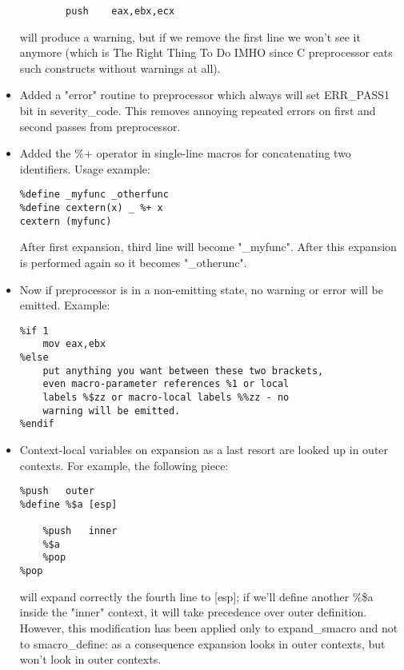 \begin{itemize}
{\begin{lstlisting}
        push    eax,ebx,ecx
\end{lstlisting}
        will produce a warning, but if we remove the first line we won't see it
        anymore (which is The Right Thing To Do \texttrademark IMHO since C
        preprocessor eats such constructs without warnings at all).}
    \item{Added a "error" routine to preprocessor which always will set ERR\_PASS1
        bit in severity\_code. This removes annoying repeated errors on first
        and second passes from preprocessor.}
    \item{Added the \%+ operator in single-line macros for concatenating two
        identifiers. Usage example:
\begin{lstlisting}
%define _myfunc _otherfunc
%define cextern(x) _ %+ x
cextern (myfunc)
\end{lstlisting}
        After first expansion, third line will become "\_myfunc". After this
        expansion is performed again so it becomes "\_otherunc".}
    \item{Now if preprocessor is in a non-emitting state, no warning or error
        will be emitted. Example:
\begin{lstlisting}
%if 1
    mov eax,ebx
%else
    put anything you want between these two brackets,
    even macro-parameter references %1 or local
    labels %$zz or macro-local labels %%zz - no
    warning will be emitted.
%endif
\end{lstlisting}}
    \item{Context-local variables on expansion as a last resort are looked up
        in outer contexts. For example, the following piece:
\begin{lstlisting}
%push   outer
%define %$a [esp]

    %push   inner
    %$a
    %pop
%pop
\end{lstlisting}
        will expand correctly the fourth line to [esp]; if we'll define another
        \%\$a inside the "inner" context, it will take precedence over outer
        definition. However, this modification has been applied only to
        expand\_smacro and not to smacro\_define: as a consequence expansion
        looks in outer contexts, but  won't look in outer contexts.

}
\end{itemize}
